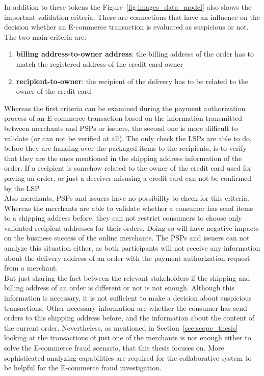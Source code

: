In addition to these tokens the Figure~\ref{fig:images_data_model} also shows the important validation criteria. These are connections that have an influence on the decision whether an \gls{E-commerce} transaction is evaluated as suspicious or not. The two main criteria are: \@

\begin{enumerate}
  \item \textbf{billing address-to-owner address}: the billing address of the order has to match the registered address of the credit card owner
  \item \textbf{recipient-to-owner}: the recipient of the delivery has to be related to the owner of the credit card
\end{enumerate}

Whereas the first criteria can be examined during the payment authorization process of an \gls{E-commerce} transaction based on the information transmitted between merchants and \gls{PSP}s or issuers, the second one is more difficult to validate (or can not be verified at all). The only check the \gls{LSP}s are able to do, before they are handing over the packaged items to the recipients, is to verify that they are the ones mentioned in the shipping address information of the order. If a recipient is somehow related to the owner of the credit card used for paying an order, or just a deceiver misusing a credit card can not be confirmed by the \gls{LSP}. \\

Also merchants, \gls{PSP}s and issuers have no possibility to check for this criteria. Whereas the merchants are able to validate whether a consumer has send items to a shipping address before, they can not restrict consumers to choose only validated recipient addresses for their orders. Doing so will have negative impacts on the business success of the online merchants. The \gls{PSP}s and issuers can not analyze this situation either, as both participants will not receive any information about the delivery address of an order with the payment authorization request from a merchant. \\

But just sharing the fact between the relevant stakeholders if the shipping and billing address of an order is different or not is not enough. Although this information is necessary, it is not sufficient to make a decision about suspicious transactions. Other necessary information are whether the consumer has send orders to this shipping address before, and the information about the content of the current order. Nevertheless, as mentioned in Section~\ref{sec:scope_thesis} looking at the transactions of just one of the merchants is not enough either to solve the \gls{E-commerce} fraud scenario, that this thesis focuses on. More sophisticated analyzing capabilities are required for the collaborative system to be helpful for the \gls{E-commerce} fraud investigation.

